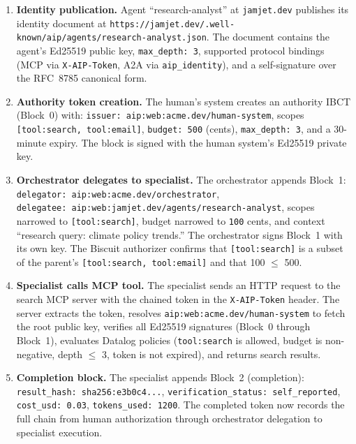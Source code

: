 \documentclass[11pt,a4paper]{article}
\newcommand{\ibct}{\textsc{IBCT}}
\newcommand{\atoa}{\textsc{A2A}}
\newcommand{\mcp}{\textsc{MCP}}
\begin{document}
\begin{enumerate}[leftmargin=*,nosep]
  \item \textbf{Identity publication.} Agent ``research-analyst'' at \texttt{jamjet.dev} publishes its identity document at \texttt{https://jamjet.dev/.well-known/aip/agents/research-analyst.json}. The document contains the agent's Ed25519 public key, \texttt{max\_depth:~3}, supported protocol bindings (\mcp{} via \texttt{X-AIP-Token}, \atoa{} via \texttt{aip\_identity}), and a self-signature over the RFC~8785 canonical form.

  \item \textbf{Authority token creation.} The human's system creates an authority \ibct{} (Block~0) with: \texttt{issuer:~aip:web:acme.dev/human-system}, scopes \texttt{[tool:search, tool:email]}, \texttt{budget:~500} (cents), \texttt{max\_depth:~3}, and a 30-minute expiry. The block is signed with the human system's Ed25519 private key.

  \item \textbf{Orchestrator delegates to specialist.} The orchestrator appends Block~1: \texttt{delegator:~aip:web:acme.dev/orchestrator}, \texttt{delegatee:~aip:web:jamjet.dev/agents/research-analyst}, scopes narrowed to \texttt{[tool:search]}, budget narrowed to \texttt{100} cents, and context ``research query: climate policy trends.'' The orchestrator signs Block~1 with its own key. The Biscuit authorizer confirms that \texttt{[tool:search]} is a subset of the parent's \texttt{[tool:search, tool:email]} and that 100 $\leq$ 500.

  \item \textbf{Specialist calls \mcp{} tool.} The specialist sends an HTTP request to the search \mcp{} server with the chained token in the \texttt{X-AIP-Token} header. The server extracts the token, resolves \texttt{aip:web:acme.dev/human-system} to fetch the root public key, verifies all Ed25519 signatures (Block~0 through Block~1), evaluates Datalog policies (\texttt{tool:search} is allowed, budget is non-negative, depth $\leq$ 3, token is not expired), and returns search results.

  \item \textbf{Completion block.} The specialist appends Block~2 (completion): \texttt{result\_hash:~sha256:e3b0c4...}, \texttt{verification\_status:~self\_reported}, \texttt{cost\_usd:~0.03}, \texttt{tokens\_used:~1200}. The completed token now records the full chain from human authorization through orchestrator delegation to specialist execution.
\end{enumerate}
\end{document}
